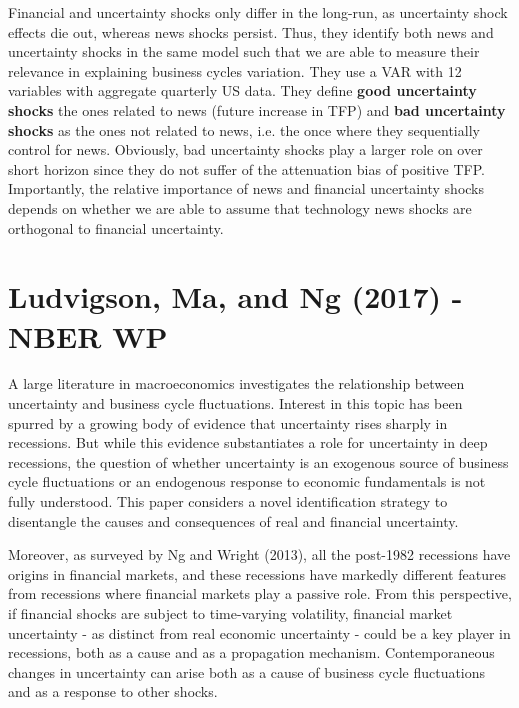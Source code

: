 \documentclass{article}
\begin{document}
{Financial and uncertainty shocks only differ in the long-run, as uncertainty shock effects die out, whereas news shocks persist. Thus, they identify both news and uncertainty shocks in the same model such that we are able to measure their relevance in explaining business cycles variation. They use a VAR with 12 variables with aggregate quarterly US data. They define \textbf{good uncertainty shocks} the ones related to news (future increase in TFP) and \textbf{bad uncertainty shocks} as the ones not related to news, i.e. the once where they sequentially control for news. Obviously, bad uncertainty shocks play a larger role on over short horizon since they do not suffer of the attenuation bias of positive TFP. Importantly, the relative importance of news and financial uncertainty shocks depends on whether we are able to assume that technology news shocks are orthogonal to financial uncertainty.


\section*{Ludvigson, Ma, and Ng (2017) - NBER WP}

A large literature in macroeconomics investigates the relationship between uncertainty and business cycle fluctuations. Interest in this topic has been spurred by a growing body of evidence that uncertainty rises sharply in recessions. But while this evidence substantiates a role for uncertainty in deep recessions, the question of whether uncertainty is an exogenous source of business cycle fluctuations or an endogenous response to economic fundamentals is not fully understood. This paper considers a novel identification strategy to disentangle the causes and consequences of real and financial uncertainty. 

Moreover, as surveyed by Ng and Wright (2013), all the post-1982 recessions have origins in financial markets, and these recessions have markedly different features from recessions where financial markets play a passive role. From this perspective, if financial shocks are subject to time-varying volatility, financial market uncertainty - as distinct from real economic uncertainty - could be a key player in recessions, both as a cause and as a propagation mechanism. Contemporaneous changes in uncertainty can arise both as a cause of business cycle fluctuations and as a response to other shocks. 

}
\end{document}
